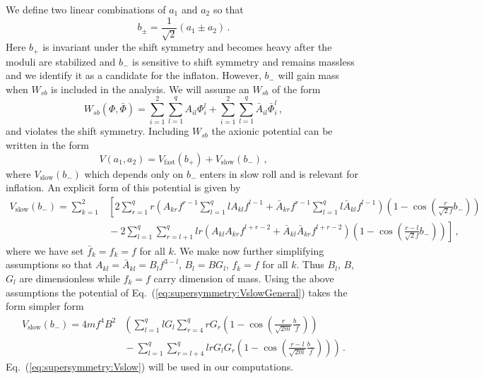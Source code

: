 \documentclass[12pt]{article}
\begin{document}
We define two linear combinations of $a_1$ and $a_2$ so that
\begin{equation} \label{eq:b+-}
  b_{\pm}= \frac{1}{\sqrt 2} \left(a_1 \pm a_2\right)\,.
\end{equation}
Here $b_+$ is invariant under the shift symmetry and becomes heavy after the moduli are stabilized and $b_-$ is sensitive to shift symmetry and remains massless and we identify it as a candidate for the inflaton.
However, $b_-$ will gain mass when $W_{sb}$ is included in the analysis.
We will assume an $W_{sb}$ of the form
\begin{equation} \label{eq:supersymmetry:Wsb}
  W_{sb}\left(\Phi, \bar\Phi\right)
    = \sum_{i = 1}^2 \sum_{l = 1}^q A_{i l} \Phi_i^l
    + \sum_{i = 1}^2 \sum_{l = 1}^q \bar A_{i l} \bar\Phi_i^l\,,
\end{equation}
and violates the shift symmetry.
Including $W_{sb}$ the axionic potential can be written in the form
\begin{equation}
  V\left(a_1, a_2\right) = V_\text{fast}\left(b_+\right) + V_\text{slow}\left(b_-\right)\,,
\end{equation}
where $V_\text{slow}\left(b_-\right)$ which depends only on $b_-$ enters in slow roll and is relevant for inflation.
An explicit form of this potential is given by
\begin{equation} \label{eq:supersymmetry:VslowGeneral}
  \begin{aligned}
    V_\text{slow}\left(b_-\right) = \sum_{k = 1}^2 &\left[
      2 \sum_{r = 1}^q r
        \left(A_{k r} f^{r - 1} \sum_{l = 1}^q l A_{k l} f^{l - 1}
          + \bar A_{k r} f^{r - 1} \sum_{l = 1}^q l \bar A_{k l} f^{l - 1}\right)
        \left(1 - \cos\left(\frac{r}{\sqrt 2 f} b_-\right)\right)
      \right.\\
      &\left.{} - 2 \sum_{l = 1}^q \sum_{r = l + 1}^q
        l r \left(A_{k l} A_{k r} f^{l + r - 2} + \bar A_{k l} \bar A_{k r} f^{l + r - 2}\right)
        \left(1 - \cos\left(\frac{r - l}{\sqrt 2 f} b_-\right)\right)
    \right]\,,
  \end{aligned}
\end{equation}
where we have set $\bar f_k = f_k = f$ for all $k$.
We make now further simplifying assumptions so that $A_{k l} = \bar A_{k l} = B_l f^{3 - l}$, $B_l = B G_l$, $f_k = f$ for all $k$.
Thus $B_l$, $B$, $G_l$ are dimensionless while $f_k = f$ carry dimension of mass.
Using the above assumptions the potential of Eq.~(\ref{eq:supersymmetry:VslowGeneral}) takes the form simpler form
\begin{equation} \label{eq:supersymmetry:Vslow}
  \begin{aligned}
    V_\text{slow}\left(b_-\right) = 4 m f^4 B^2 &\left(
      \sum_{l = 1}^q l G_l \sum_{r = 4}^q r G_r
        \left(1 - \cos\left(\frac{r}{\sqrt{2 m}} \frac{b_-}{f}\right)\right)\right. \\
      &\left.{} - \sum_{l = 1}^q \sum_{r = l + 4}^q l r G_l G_r
        \left(1 - \cos\left(\frac{r - l}{\sqrt{2 m}} \frac{b_-}{f}\right)\right)
    \right)\,.
  \end{aligned}
\end{equation}
Eq.~(\ref{eq:supersymmetry:Vslow}) will be used in our computations.
\end{document}
